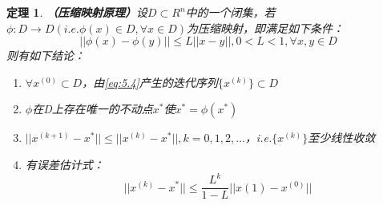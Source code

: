 \documentclass[a4paper]{article}
\newtheorem{theorem}{定理}[section]
\begin{document}
\begin{theorem}
    \textbf{（压缩映射原理）}设$D\subset R^n$中的一个闭集，若$\phi:D\rightarrow D (i.e. \phi(x)\in D, \forall x \in D)$为压缩映射，即满足如下条件：
    \begin{equation}
        ||\phi(x)-\phi(y) ||\le L||x-y||, 0<L<1, \forall x,y\in D
    \end{equation}
    则有如下结论：
    \begin{enumerate}
        \item $\forall x^{(0)}\subset D $，由\ref{eq:5.4}产生的迭代序列$\{x^{(k)} \}\subset D$
        \item $\phi$在D上存在唯一的不动点$x^*$使$x^*=\phi(x^*)$
        \item $||x^{(k+1)}-x^* ||\le ||x^{(k)}-x^* ||,k=0,1,2,\dots$，i.e.$\{x^{(k)} \}$至少线性收敛
        \item 有误差估计式：
        \begin{equation}
            ||x^{(k)}-x^* ||\le \frac{L^k}{1-L}||x{(1)}-x^{(0)} ||
        \end{equation}
    \end{enumerate}
\end{theorem}
\end{document}
